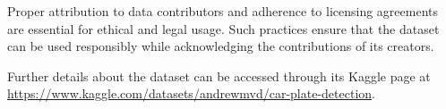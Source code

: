 Proper attribution to data contributors and adherence to licensing agreements are essential for ethical and legal usage. Such practices ensure that the dataset can be used responsibly while acknowledging the contributions of its creators.

Further details about the dataset can be accessed through its Kaggle page at \url{https://www.kaggle.com/datasets/andrewmvd/car-plate-detection}.
